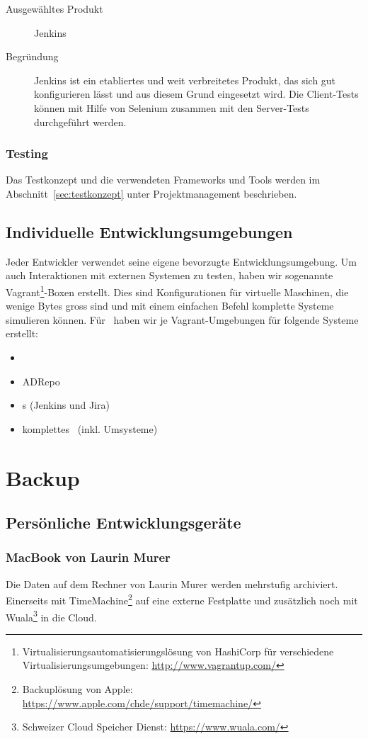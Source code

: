 			\begin{description}
				\item[Ausgewähltes Produkt] Jenkins
				\item[Begründung] Jenkins ist ein etabliertes und weit verbreitetes Produkt, 
					das sich gut konfigurieren lässt und aus diesem Grund eingesetzt wird.
					Die Client-Tests können mit Hilfe von Selenium zusammen mit den Server-Tests durchgeführt werden.
			\end{description}
			
			\subsubsection{Testing}
				Das Testkonzept und die verwendeten Frameworks und Tools werden im Abschnitt~\ref{sec:testkonzept} unter Projektmanagement beschrieben.
				

		\subsection{Individuelle Entwicklungsumgebungen}
			Jeder Entwickler verwendet seine eigene bevorzugte Entwicklungsumgebung.
			Um auch Interaktionen mit externen Systemen zu testen,
			haben wir sogenannte Vagrant\footnote{Virtualisierungsautomatisierungslösung von HashiCorp für verschiedene Virtualisierungsumgebungen: \url{http://www.vagrantup.com/}}-Boxen erstellt.
			Dies sind Konfigurationen für virtuelle Maschinen, die wenige Bytes gross sind
			und mit einem einfachen Befehl komplette Systeme simulieren können.
			Für \eeppi\ haben wir je Vagrant-Umgebungen für folgende Systeme erstellt:
			\begin{itemize}
				\item{\cdar}
				\item{ADRepo}
				\item{\ppt s (Jenkins und Jira)}
				\item{komplettes \eeppi\ (inkl. Umsysteme)}
			\end{itemize}


	\section{Backup}
		\subsection{Persönliche Entwicklungsgeräte}
			\subsubsection{MacBook von Laurin Murer}\label{backupLaurin}
				Die Daten auf dem Rechner von Laurin Murer werden mehrstufig archiviert.
				Einerseits mit TimeMachine\footnote{Backuplösung von Apple: \url{https://www.apple.com/chde/support/timemachine/}} auf eine externe Festplatte und zusätzlich noch mit Wuala\footnote{Schweizer Cloud Speicher Dienst: \url{https://www.wuala.com/}} in die Cloud.


